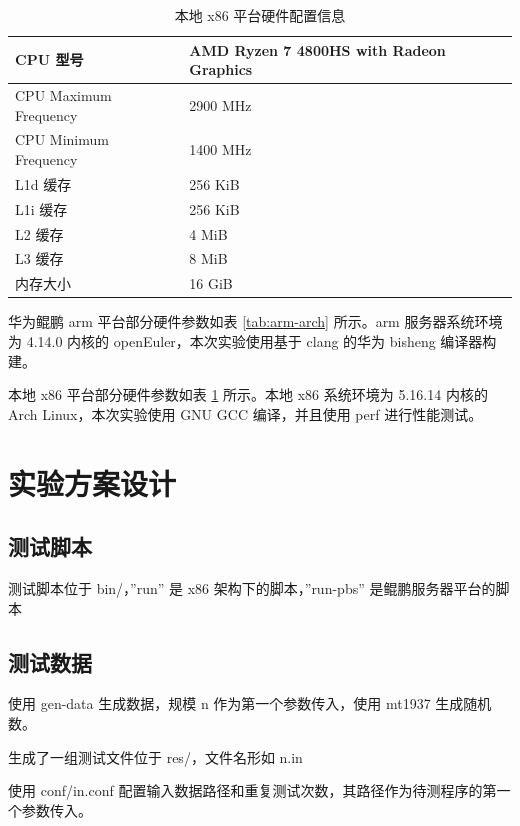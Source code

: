 \documentclass[a4paper]{article}
\begin{document}
\begin{table}[]
  \centering
  \begin{tabular}{ll}
    \hline
    CPU 型号              & AMD Ryzen 7 4800HS with Radeon Graphics \\   \hline
    CPU Maximum Frequency & 2900 MHz                                \\   \hline
    CPU Minimum Frequency & 1400 MHz                                \\   \hline
    L1d 缓存              & 256 KiB                                 \\   \hline
    L1i 缓存              & 256 KiB                                 \\   \hline
    L2 缓存               & 4 MiB                                   \\   \hline
    L3 缓存               & 8 MiB                                   \\   \hline
    内存大小              & 16 GiB                                  \\   \hline
  \end{tabular}
  \caption{本地 x86 平台硬件配置信息}
  \label{tab:x86-arch}
\end{table}

华为鲲鹏 arm 平台部分硬件参数如表 \ref{tab:arm-arch} 所示。arm 服务器系统环境为 4.14.0 内核的 openEuler，本次实验使用基于 clang 的华为 bisheng 编译器构建。

本地 x86 平台部分硬件参数如表 \ref{tab:x86-arch} 所示。本地 x86 系统环境为 5.16.14 内核的 Arch Linux，本次实验使用 GNU GCC 编译，并且使用 perf 进行性能测试。

\section{实验方案设计}
\subsection{测试脚本}
测试脚本位于 bin/，''run'' 是 x86 架构下的脚本，''run-pbs'' 是鲲鹏服务器平台的脚本

\subsection{测试数据}
使用 gen-data 生成数据，规模 n 作为第一个参数传入，使用 mt1937 生成随机数。

生成了一组测试文件位于 res/，文件名形如 n.in

使用 conf/in.conf 配置输入数据路径和重复测试次数，其路径作为待测程序的第一个参数传入。
\end{document}
